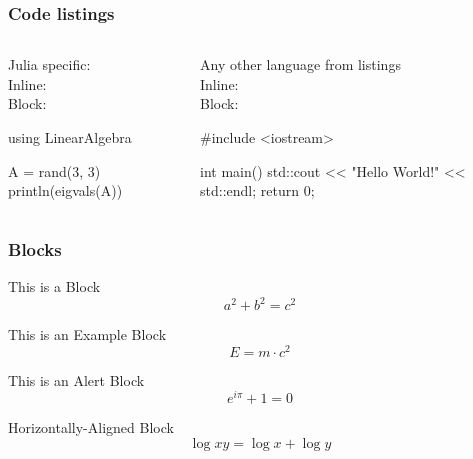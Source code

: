\documentclass[compress,aspectratio=169]{beamer}
\begin{document}
\begin{frame}[fragile]
    \frametitle{Code listings}
    \begin{columns}[t]
        \begin{column}{0.5\textwidth}
            Julia specific: \\
            Inline:  \\
            Block:  
            \begin{jllisting}[gobble=16]
                using LinearAlgebra

                A = rand(3, 3)
                println(eigvals(A))
            \end{jllisting}
        \end{column}
        \begin{column}{0.5\textwidth}
            Any other language from listings \\
            Inline:  \\
            Block:
            \begin{clisting}[language=c++, gobble=16]
                #include <iostream>

                int main() {
                    std::cout << "Hello World!" << std::endl;
                    return 0;
                }
            \end{clisting}
            
        \end{column}
    \end{columns}
\end{frame}

\begin{frame}
  \frametitle{Blocks}
  \begin{block}{This is a Block}
    \[
      a^2 + b^2 = c^2
    \]
  \end{block}
  \begin{exampleblock}{This is an Example Block}
    \[
      E = m \cdot c^{2}
    \]
  \end{exampleblock}
  \begin{alertblock}{This is an Alert Block}
    \[
      e^{i\pi} + 1 = 0
    \]
  \end{alertblock}

  \centering
  \begin{minipage}{1.0\linewidth}
    \begin{block}{Horizontally-Aligned Block}
      \[
        \log xy = \log x + \log y
      \]
    \end{block}
  \end{minipage}
\end{frame}
\end{document}
